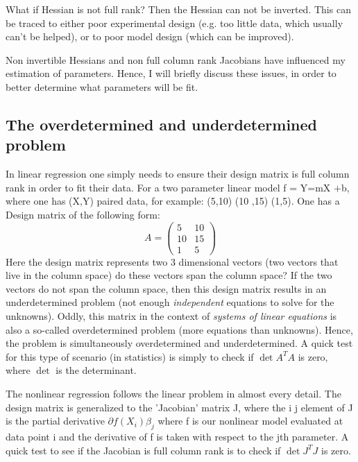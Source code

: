  What if Hessian is not full rank?  Then the Hessian can not be inverted.  This can be traced to either poor experimental design (e.g. too little data, which usually can't be helped), or to poor model design (which can be improved).  
 
 Non invertible Hessians and non full column rank Jacobians have influenced my estimation of parameters.  Hence, I will briefly discuss these issues, in order to better determine what parameters will be fit.
 
 \subsection{The overdetermined and underdetermined problem}\label{overdeter}
In linear regression one simply needs to ensure their design matrix is full column rank in order to fit their data.  For a two parameter linear model f = Y=mX +b, where one has (X,Y) paired data, for example: (5,10) (10 ,15) (1,5).  One has a Design matrix of the following form:
\[ A =
\begin{pmatrix}
5 & 10 \\
10&15\\
1&5
\end{pmatrix}
\]
Here the design matrix represents two 3 dimensional vectors (two vectors that live in the column space) do these vectors span the column space?  If the two vectors do not span the column space, then this design matrix results in an underdetermined problem (not enough \emph{independent} equations to solve for the unknowns).  Oddly, this matrix in the context of \emph{systems of linear equations} is also a so-called overdetermined problem (more equations than unknowns).  Hence, the problem is simultaneously overdetermined and underdetermined.  A quick test for this type of scenario (in statistics) is simply to check if $\det{A^TA}$ is zero, where $\det$ is  the determinant.

The nonlinear regression follows the linear problem in almost every detail.  The design matrix is generalized to the 'Jacobian' matrix J, where the i j element of J is the partial derivative $\partial{f(X_i)}{\beta_j}$ where f is our nonlinear model evaluated at data point i and the derivative of f is taken with respect to the jth parameter.  A quick test to see if the Jacobian is full column rank is to check if $\det{J^TJ}$ is zero.

